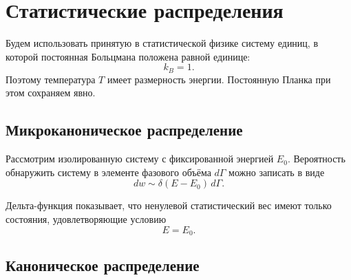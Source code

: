 \documentclass[../final.tex]{subfiles}
\begin{document}




\section*{Статистические распределения}

Будем использовать принятую в статистической физике систему единиц,
в которой постоянная Больцмана положена равной единице:
%
\begin{equation*}
    k_B=1.
\end{equation*}
%
Поэтому температура $T$ имеет размерность энергии.
Постоянную Планка при этом сохраняем явно.



\subsection*{Микроканоническое распределение}

Рассмотрим изолированную систему с фиксированной энергией $E_0$.
Вероятность обнаружить систему в элементе фазового объёма $d\Gamma$
можно записать в виде
%
\begin{equation*}
    dw
    \sim
    \delta(E-E_0)\,d\Gamma.
\end{equation*}

Дельта-функция показывает, что ненулевой статистический вес
имеют только состояния, удовлетворяющие условию
%
\begin{equation*}
    E=E_0.
\end{equation*}



\subsection*{Каноническое распределение}
\end{document}
